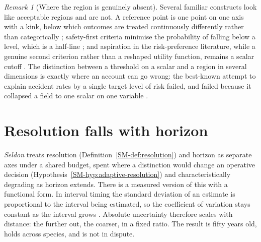 \documentclass[11pt,a4paper]{article}
\theoremstyle{remark}
\newtheorem{remark}{Remark}[section]
\begin{document}
\begin{remark}[Where the region is genuinely absent]\label{rem:thresholds}
Several familiar constructs look like acceptable regions and are not. A reference point is one point
on one axis with a kink, below which outcomes are treated continuously differently rather than
categorically \citep{kahneman1979}; safety-first criteria minimise the probability of falling below a
level, which is a half-line \citep{roy1952}; and aspiration in the risk-preference literature, while
a genuine second criterion rather than a reshaped utility function, remains a scalar cutoff
\citep{lopes1999}. The distinction between a threshold on a scalar and a region in several
dimensions is exactly where an account can go wrong: the best-known attempt to explain accident
rates by a single target level of risk failed, and failed because it collapsed a field to one scalar
on one variable \citep{wilde1982,evans1986}.
\end{remark}

\section{Resolution falls with horizon}\label{sec:resolution}
\emph{Seldon} treats resolution (Definition~\ref{SM-def:resolution}) and horizon as separate axes
under a shared budget, spent where a distinction would change an operative decision
(Hypothesis~\ref{SM-hyp:adaptive-resolution}) and characteristically degrading as horizon extends.
There is a measured version of this with a functional form. In interval timing the standard deviation of an estimate is proportional to the
interval being estimated, so the coefficient of variation stays constant as the interval grows
\citep{gibbon1977,rakitin1998,zeki2019}. Absolute uncertainty therefore scales with distance: the
further out, the coarser, in a fixed ratio. The result is fifty years old, holds across species, and
is not in dispute.
\end{document}
